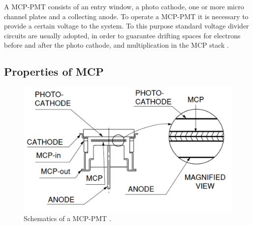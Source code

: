 A MCP-PMT consists of an entry window, a photo cathode, one or more micro channel plates and a collecting anode.
To operate a MCP-PMT it is necessary to provide a certain voltage to the system. To this purpose standard voltage divider circuits are usually adopted, in order to guarantee drifting spaces for electrons before and after the photo cathode, and multiplication in the MCP stack \cite{Hama2006}.

  
\subsection{Properties of MCP}
\begin{figure}[htbp]
\begin{center}
\includegraphics[width=12cm]{../Pictures/Chapter_3/MCP_struct}
\end{center}
\caption[MCP schematics]{Schematics of a MCP-PMT \cite{Hama2006}.}
\label{fig:MCP_struct}
\end{figure}
